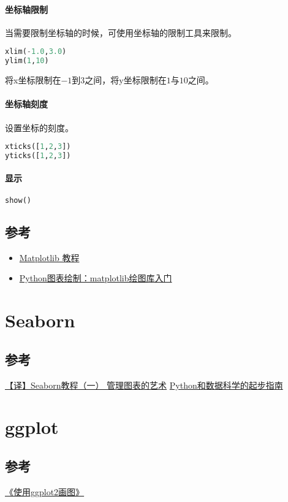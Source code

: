 \documentclass{ctexart}
\begin{document}
\paragraph{坐标轴限制}
当需要限制坐标轴的时候，可使用坐标轴的限制工具来限制。
\begin{lstlisting}[language=python]
xlim(-1.0,3.0)
ylim(1,10)
\end{lstlisting}
将x坐标限制在$-1$到$3$之间，将y坐标限制在$1$与$10$之间。

\paragraph{坐标轴刻度}
设置坐标的刻度。
\begin{lstlisting}[language=python]
xticks([1,2,3])
yticks([1,2,3])
\end{lstlisting}

\paragraph{显示}
\begin{lstlisting}[language=python]
show()
\end{lstlisting}


\subsection{参考}
\begin{itemize}
\item  \href{http://liam0205.me/2014/09/11/matplotlib-tutorial-zh-cn/}{Matplotlib 教程}
\item \href{http://blog.csdn.net/ywjun0919/article/details/8692018}{Python图表绘制：matplotlib绘图库入门}
\end{itemize}

\section{Seaborn}
\subsection{参考}
\href{https://segmentfault.com/a/1190000005092460}{【译】Seaborn教程（一） 管理图表的艺术}
\href{http://python.jobbole.com/80853}{Python和数据科学的起步指南}

\section{ggplot}
\subsection{参考}
\href{https://www.plob.org/article/7264.html}{《使用ggplot2画图》}
\end{document}
